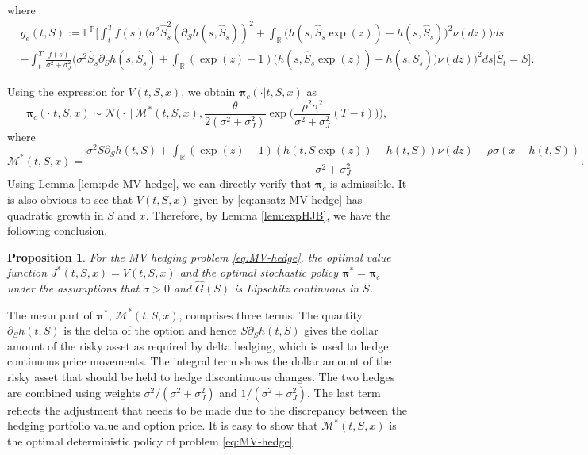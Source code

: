 \documentclass[11pt]{article}
\newtheorem{proposition}{Proposition}
\newcommand{\1}{\mathbbm{1}}
\newcommand{\bpi}{\boldsymbol{\pi}}
\begin{document}
where
\begin{align}
	&g_e(t,S):=\mathbb{E}^{\mathbb{P}}\bigg[\int_t^T f(s)\bigg(\sigma^2 \hat{S}_s^2(\partial_Sh(s,\hat{S}_s))^2 + \int_{\mathbb{R}}\big(h(s,\hat{S}_s\exp(z))-h(s,\hat{S}_s)\big)^2\nu(dz)\bigg)ds\\
	& - \int_t^T\frac{f(s)}{\sigma^2+\sigma_J^2}\bigg(\sigma^2\hat{S}_s\partial_Sh(s,\hat{S}_s) + \int_{\mathbb{R}}(\exp(z)-1)\big(h(s,\hat{S}_s\exp(z))-h(s,\hat{S}_s)\big)\nu(dz)\bigg)^2ds\bigg|\hat{S}_t=S\bigg].\label{eq:g_e}
\end{align}

Using the expression for $V(t,S,x)$, we obtain $\bpi_c(\cdot|t,S,x)$ as
\begin{equation}\label{eq:policy-optimal-MV-hedge}
	\bpi_c(\cdot|t,S,x)\sim\mathcal{N}\bigg(\cdot\ \bigg|\ \mathcal{M}^*(t,S,x), \frac{\theta}{2(\sigma^2+\sigma_J^2)}\exp\bigg(\frac{\rho^2\sigma^2}{\sigma^2+\sigma_J^2}(T-t)\bigg)\bigg),
\end{equation}
where
\begin{equation}\label{eq:mean-policy-optimal-MV-hedge}
	\mathcal{M}^*(t,S,x)=\frac{\sigma^2S\partial_Sh(t,S)+\int_{\mathbb{R}}(\exp(z)-1)(h(t,S\exp(z))-h(t,S))\nu(dz)-\rho\sigma(x-h(t,S))}{\sigma^2+\sigma_J^2}.
\end{equation}
Using Lemma \ref{lem:pde-MV-hedge}, we can directly verify that
$\bpi_c$ is admissible. It is also obvious to see that $V(t,S,x)$ given by \eqref{eq:ansatz-MV-hedge} has quadratic growth in $S$ and $x$. Therefore, by Lemma \ref{lem:expHJB}, we have the following conclusion.
\begin{proposition}\label{prop:MV-opt}
	For the MV hedging problem \eqref{eq:MV-hedge}, the optimal value function $J^*(t,S,x)=V(t,S,x)$ and the optimal stochastic policy $\bpi^*=\bpi_c$ under the assumptions that $\sigma>0$ and $\hat{G}(S)$ is Lipschitz continuous in $S$.
\end{proposition}

The mean part of $\bpi^*$, $\mathcal{M}^*(t,S,x)$,  comprises three terms. The quantity $\partial_Sh(t,S)$ is the delta of the option and hence $S\partial_Sh(t,S)$ gives the dollar amount of the risky asset as required by delta hedging, which is used to hedge continuous price movements. The integral term shows the dollar amount of the risky asset that should be held to hedge discontinuous changes. The two hedges are combined using weights $\sigma^2/(\sigma^2+\sigma_J^2)$ and $1/(\sigma^2+\sigma_J^2)$. The last term reflects the adjustment that needs to be made due to the discrepancy between the hedging portfolio value and option price. It is easy to show that $\mathcal{M}^*(t,S,x)$ is the optimal deterministic policy of problem \eqref{eq:MV-hedge}.
\end{document}
